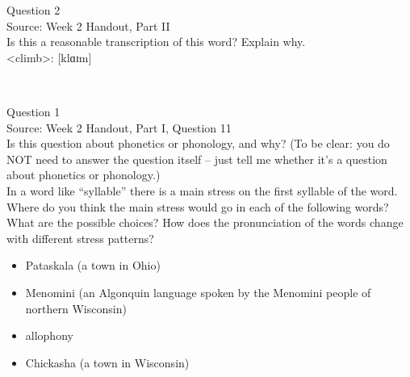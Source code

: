 \documentclass[12pt]{article}
\begin{document}
\newpage

{\large Question 2}\\

Source: Week 2 Handout, Part II\\

Is this a reasonable transcription of this word? Explain why.\\

<climb>: {[klɑɪm]}


\newpage

\begin{center}
\textbf{{\color{red}{\HUGE END OF EXAM}}}\\

\end{center}
\newpage

\begin{center}
\textbf{{\color{blue}{\HUGE START OF EXAM\\}}}

\textbf{{\color{blue}{\HUGE Student ID: 38415\\}}}

\textbf{{\color{blue}{\HUGE 4:30\\}}}

\end{center}
\newpage

{\large Question 1}\\

Source: Week 2 Handout, Part I, Question 11\\

Is this question about phonetics or phonology, and why? (To be clear: you do NOT need to answer the question itself -- just tell me whether it's a question about phonetics or phonology.)\\

In a word like ``syllable'' there is a main stress on the first syllable of the word. Where do you think the main stress would go in each of the following words? What are the possible choices? How does the pronunciation of the words change with different stress patterns? \begin{itemize} \item Pataskala (a town in Ohio) \item Menomini (an Algonquin language spoken by the Menomini people of northern Wisconsin) \item allophony \item Chickasha (a town in Wisconsin) \end{itemize}
\end{document}

